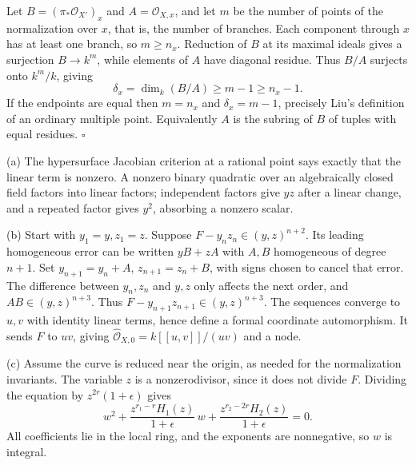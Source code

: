 \documentclass[11pt]{article}
\let\chapterexercise\exercise
\renewcommand{\exercise}[2]{\Needspace{8\baselineskip}\chapterexercise{#1}{#2}}
\begin{document}
\pf
Let $B=(\pi_*\mathcal O_{X'})_x$ and $A=\mathcal O_{X,x}$, and let $m$ be the number of points of the normalization over $x$, that is, the number of branches. Each component through $x$ has at least one branch, so $m\ge n_x$. Reduction of $B$ at its maximal ideals gives a surjection $B\to k^m$, while elements of $A$ have diagonal residue. Thus $B/A$ surjects onto $k^m/k$, giving
\[ \delta_x=\dim_k(B/A)\ge m-1\ge n_x-1. \]
If the endpoints are equal then $m=n_x$ and $\delta_x=m-1$, precisely Liu's definition of an ordinary multiple point. Equivalently $A$ is the subring of $B$ of tuples with equal residues. \hfill$\square$

\pf
(a) The hypersurface Jacobian criterion at a rational point says exactly that the linear term is nonzero. A nonzero binary quadratic over an algebraically closed field factors into linear factors; independent factors give $yz$ after a linear change, and a repeated factor gives $y^2$, absorbing a nonzero scalar.

(b) Start with $y_1=y,z_1=z$. Suppose $F-y_nz_n\in(y,z)^{n+2}$. Its leading homogeneous error can be written $yB+zA$ with $A,B$ homogeneous of degree $n+1$. Set $y_{n+1}=y_n+A$, $z_{n+1}=z_n+B$, with signs chosen to cancel that error. The difference between $y_n,z_n$ and $y,z$ only affects the next order, and $AB\in(y,z)^{n+3}$. Thus $F-y_{n+1}z_{n+1}\in(y,z)^{n+3}$. The sequences converge to $u,v$ with identity linear terms, hence define a formal coordinate automorphism. It sends $F$ to $uv$, giving $\widehat{\mathcal O}_{X,0}=k[[u,v]]/(uv)$ and a node.

(c) Assume the curve is reduced near the origin, as needed for the normalization invariants. The variable $z$ is a nonzerodivisor, since it does not divide $F$. Dividing the equation by $z^{2r}(1+\epsilon)$ gives
\[ w^2+\frac{z^{r_1-r}H_1(z)}{1+\epsilon}\,w+
\frac{z^{r_2-2r}H_2(z)}{1+\epsilon}=0. \]
All coefficients lie in the local ring, and the exponents are nonnegative, so $w$ is integral.
\end{document}
